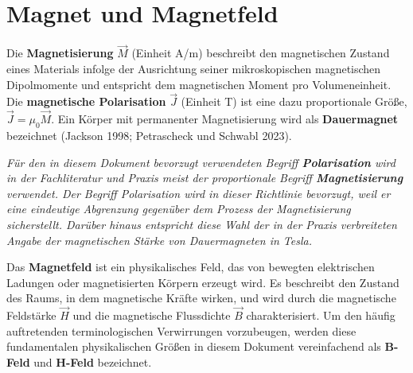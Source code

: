 \documentclass[
  ngerman,
  a4paper,
  twoside]{scrbook}
\newcounter{quartocallouttipno}
\newcommand{\quartocallouttip}[1]{\refstepcounter{quartocallouttipno}\label{#1}}
\begin{document}
\section{Magnet und Magnetfeld}\label{sec-03-magnet_und_magnetfeld}

Die \textbf{Magnetisierung} \(\vec{M}\) (Einheit A/m) beschreibt den
magnetischen Zustand eines Materials infolge der Ausrichtung seiner
mikroskopischen magnetischen Dipolmomente und entspricht dem
magnetischen Moment pro Volumeneinheit. Die \textbf{magnetische
Polarisation} \(\vec{J}\) (Einheit T) ist eine dazu proportionale Größe,
\(\vec{J}=μ_0 \vec{M}\). Ein Körper mit permanenter Magnetisierung wird
als \textbf{Dauermagnet} bezeichnet (Jackson 1998; Petrascheck und
Schwabl 2023).

\begin{tcolorbox}[enhanced jigsaw, arc=.35mm, bottomrule=.15mm, bottomtitle=1mm, breakable, colback=white, colbacktitle=quarto-callout-tip-color!10!white, colframe=quarto-callout-tip-color-frame, coltitle=black, left=2mm, leftrule=.75mm, opacityback=0, opacitybacktitle=0.6, rightrule=.15mm, title=\textcolor{quarto-callout-tip-color}{\faLightbulb}\hspace{0.5em}{Hinweis \ref*{tip-03-JvsM}}, titlerule=0mm, toprule=.15mm, toptitle=1mm]

\quartocallouttip{tip-03-JvsM} 

\emph{Für den in diesem Dokument bevorzugt verwendeten Begriff
\textbf{Polarisation} wird in der Fachliteratur und Praxis meist der
proportionale Begriff \textbf{Magnetisierung} verwendet. Der Begriff
Polarisation wird in dieser Richtlinie bevorzugt, weil er eine
eindeutige Abgrenzung gegenüber dem Prozess der Magnetisierung
sicherstellt. Darüber hinaus entspricht diese Wahl der in der Praxis
verbreiteten Angabe der magnetischen Stärke von Dauermagneten in Tesla.}

\end{tcolorbox}

Das \textbf{Magnetfeld} ist ein physikalisches Feld, das von bewegten
elektrischen Ladungen oder magnetisierten Körpern erzeugt wird. Es
beschreibt den Zustand des Raums, in dem magnetische Kräfte wirken, und
wird durch die magnetische Feldstärke \(\vec{H}\) und die magnetische
Flussdichte \(\vec{B}\) charakterisiert. Um den häufig auftretenden
terminologischen Verwirrungen vorzubeugen, werden diese fundamentalen
physikalischen Größen in diesem Dokument vereinfachend als
\textbf{B-Feld} und \textbf{H-Feld} bezeichnet.
\end{document}
